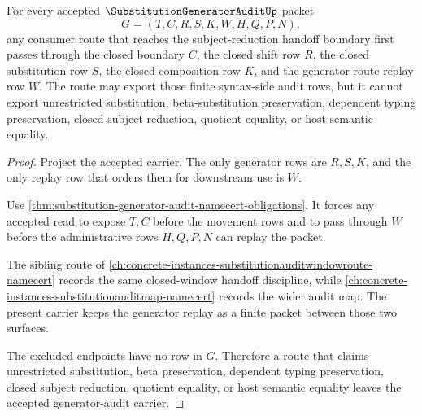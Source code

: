 \begin{theorem}
\label{thm:substitution-generator-audit-route-lock}
For every accepted $\SubstitutionGeneratorAuditUp$ packet
$$
G=(T,C,R,S,K,W,H,Q,P,N),
$$
any consumer route that reaches the subject-reduction handoff boundary first passes through the closed boundary $C$, the closed shift row $R$, the closed substitution row $S$, the closed-composition row $K$, and the generator-route replay row $W$. The route may export those finite syntax-side audit rows, but it cannot export unrestricted substitution, beta-substitution preservation, dependent typing preservation, closed subject reduction, quotient equality, or host semantic equality.
\end{theorem}
\begin{proof}
Project the accepted carrier. The only generator rows are $R,S,K$, and the only replay row that orders them for downstream use is $W$.

Use \autoref{thm:substitution-generator-audit-namecert-obligations}. It forces any accepted read to expose $T,C$ before the movement rows and to pass through $W$ before the administrative rows $H,Q,P,N$ can replay the packet.

The sibling route of \autoref{ch:concrete-instances-substitutionauditwindowroute-namecert} records the same closed-window handoff discipline, while \autoref{ch:concrete-instances-substitutionauditmap-namecert} records the wider audit map. The present carrier keeps the generator replay as a finite packet between those two surfaces.

The excluded endpoints have no row in $G$. Therefore a route that claims unrestricted substitution, beta preservation, dependent typing preservation, closed subject reduction, quotient equality, or host semantic equality leaves the accepted generator-audit carrier.
\end{proof}

